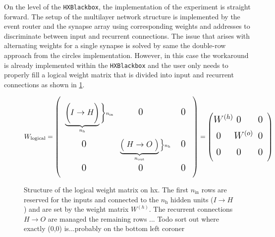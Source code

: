 On the level of the \texttt{HXBlackbox}, the implementation of the experiment is straight forward. The setup of the multilayer network structure is implemented by the event router and the synapse array using corresponding weights and addresses to discriminate between input and recurrent connections. The issue that arises with alternating weights for a single synapse is solved by same the double-row approach from the circles implementation. However, in this case the workaround is already implemented within the \texttt{HXBlackbox} and the user only needs to properly fill a logical weight matrix that is divided into input and recurrent connections as shown in \cref{hxnetworksetup}.
\begin{figure}
\[
\sbox0{$\begin{matrix}1&2&3\\0&1&1\\0&0&1\\0&0&1\end{matrix}$}
\sbox1{$\begin{matrix}1&2&3\\0&1&1\\0&0&1\end{matrix}$}
\sbox2{$\begin{matrix}1&2\\0&1\end{matrix}$}
%
W_\text{logical}=\left(
\begin{array}{c c c}
\vphantom{\usebox{0}}\underbrace{\Bigg(\makebox[\wd0]{\large$I \rightarrow H$}\Bigg)}_{n_\text{h}}\Bigg\}\scriptstyle{n_\text{in}}&
\makebox[\wd0]{\Large0\quad} & 
\makebox[0.5\wd0]{\Large0}\\
\vphantom{\usebox{1}}	\makebox[\wd1]{\Large0\quad}&
\underbrace{\Big(\makebox[1.3\wd0]{\large$H \rightarrow O$}\Big)}_{n_\text{out}}\Big\}\scriptstyle{n_\text{h}} &
\makebox[0.5\wd1]{\Large0}\\

\vphantom{\usebox{2}}	\makebox[\wd2]{\Large0\quad}&
\makebox[\wd2]{\Large0\quad}&
\makebox[0.5\wd2]{\Large0}

\end{array}
\right)
=
\left(
\begin{array}{c c c}
\vphantom{\usebox{2}}\makebox[\wd2]{\Large$W^{(h)}$}&
\makebox[\wd2]{\Large0\quad} & 
\makebox[0.5\wd2]{\Large0}\\
\vphantom{\usebox{2}}	\makebox[\wd2]{\Large0\quad}&
\makebox[\wd2]{\Large$W^{(o)}$} &
\makebox[0.5\wd2]{\Large0}\\
\vphantom{\usebox{2}}	\makebox[\wd2]{\Large0\quad}&
\makebox[\wd2]{\Large0\quad} &
\makebox[0.5\wd2]{\Large0}

\end{array}
\right)
	\]
\caption[Structure of the logical weight matrix on \gls{hx}]{Structure of the logical weight matrix on \gls{hx}. The first $n_\text{in}$ rows are reserved for the inputs and connected to the $n_\text{h}$ hidden units ($I\rightarrow H$) and are set by the weight matrix $W^{(h)}$. The recurrent connections  $H\rightarrow O $ are managed the remaining rows ... Todo sort out where exactly (0,0) is...probably on the bottom left coroner}
\label{hxnetworksetup}
\end{figure}

